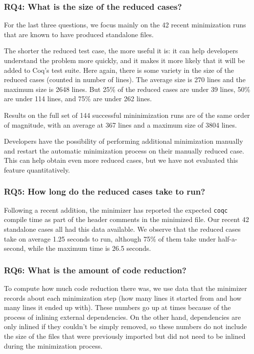 \documentclass[a4paper,USenglish,cleveref,autoref,thm-restate]{lipics-v2021}
\begin{document}
\subsubsection{RQ4: What is the size of the reduced cases?}

For the last three questions, we focus mainly on the 42 recent minimization runs that are known to have produced standalone files.

The shorter the reduced test case, the more useful it is: it can help developers understand the problem more quickly, and it makes it more likely that it will be added to Coq's test suite. Here again, there is some variety in the size of the reduced cases (counted in number of lines). The average size is 270 lines and the maximum size is 2648 lines. But 25\% of the reduced cases are under 39 lines, 50\% are under 114 lines, and 75\% are under 262 lines.

Results on the full set of 144 successful mininimization runs are of the same order of magnitude, with an average at 367 lines and a maximum size of 3804 lines.

Developers have the possibility of performing additional minimization manually and restart the automatic minimization process on their manually reduced case. This can help obtain even more reduced cases, but we have not evaluated this feature quantitatively.

\subsubsection{RQ5: How long do the reduced cases take to run?}

Following a recent addition, the minimizer has reported the expected \texttt{coqc} compile time as part of the header comments in the minimized file. Our recent 42 standalone cases all had this data available. We observe that the reduced cases take on average 1.25 seconds to run, although 75\% of them take under half-a-second, while the maximum time is 26.5 seconds.

\subsubsection{RQ6: What is the amount of code reduction?}

To compute how much code reduction there was, we use data that the minimizer records about each minimization step (how many lines it started from and how many lines it ended up with). These numbers go up at times because of the process of inlining external dependencies. On the other hand, dependencies are only inlined if they couldn't be simply removed, so these numbers do not include the size of the files that were previously imported but did not need to be inlined during the minimization process.
\end{document}
